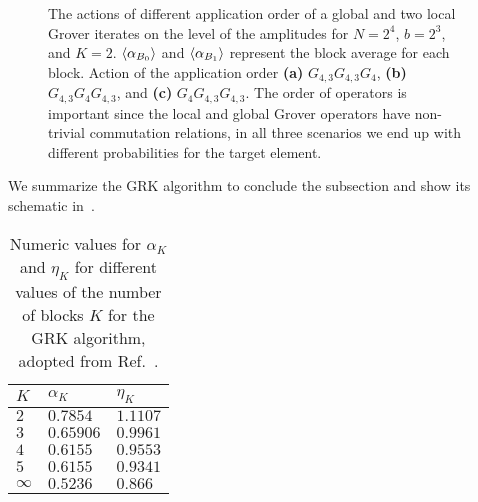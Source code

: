 \begin{figure}[h]
	\caption[The actions of different ordering of a global and two local Grover iterates on the level of the amplitudes for ${N=2^4}$, ${b=2^3}$, and ${K=2}$. $\ev{\alpha_{B_0}}$ and $\ev{\alpha_{B_1}}$ represent the block average for each block.]{The actions of different application order of a global and two local Grover iterates on the level of the amplitudes for ${N=2^4}$, ${b=2^3}$, and ${K=2}$. $\ev{\alpha_{B_0}}$ and $\ev{\alpha_{B_1}}$ represent the block average for each block. Action of the application order \textbf{(a)} $G_{4,3}G_{4,3}G_{4}$, \textbf{(b)} $G_{4,3}G_{4}G_{4,3}$, and \textbf{(c)} $G_{4}G_{4,3}G_{4,3}$. The order of operators is important since the local and global Grover operators have non-trivial commutation relations, in all three scenarios we end up with different probabilities for the target element.}
\end{figure}

\bigskip
\noindent
We summarize the \acs{GRK} algorithm to conclude the subsection and show its schematic in~.

\begin{table}[h]
		\centering
		\caption[Numeric values for $\alpha_K$ and $\eta_K$ for different values of the number of blocks $K$ for the \acs{GRK} algorithm adopted from Korepin et. al]{Numeric values for $\alpha_K$ and $\eta_K$ for different values of the number of blocks $K$ for the \acs{GRK} algorithm, adopted from Ref.~\protect\cite{Korepin_2005}.}
		\begin{tabular}{lll}
			\toprule
			$K$ & $\alpha_K$ & $\eta_K$ \\
			\toprule
			$2$  & $0.7854$     & $1.1107$ \\
			$3$  & $0.65906$    & $0.9961$ \\ 
			$4$  & $0.6155$     & $0.9553$ \\
			$5$  & $0.6155$     & $0.9341$ \\
			$\infty$ & $0.5236$ & $0.866$  \\
			\toprule
		\end{tabular}
\end{table}

